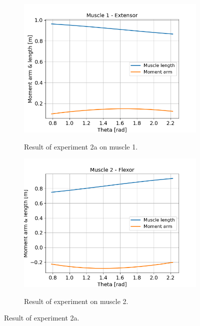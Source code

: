 \documentclass{cmc}
\begin{document}
\begin{figure}[H]
  \centering
  \begin{subfigure}[b]{0.48\textwidth}
    { \centering
      \includegraphics[width=\textwidth]{figures/2a_Length_and_Moment_Arm_m1.png} }
    \caption{Result of experiment 2a on muscle 1.}
    \label{fig:2a_M1}
  \end{subfigure}
  \begin{subfigure}[b]{0.48\textwidth}
    { \centering
      \includegraphics[width=\textwidth]{figures/2a_Length_and_Moment_Arm_m2.png} }
    \caption{Result of experiment on muscle 2.}
    \label{fig:2a_m2}
  \end{subfigure}
  \caption{Result of experiment 2a.}
  \label{fig:2a}
\end{figure}
\end{document}
